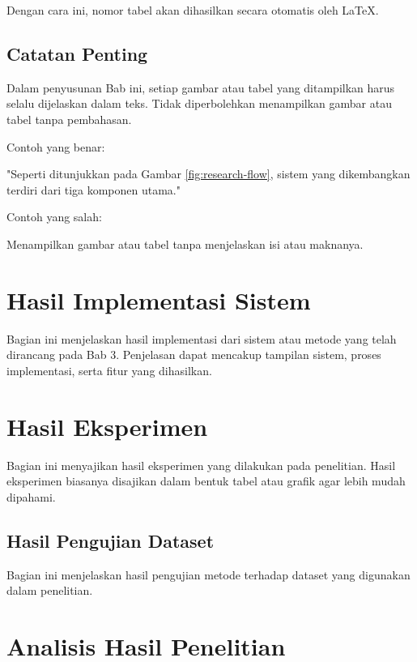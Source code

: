 Dengan cara ini, nomor tabel akan dihasilkan secara otomatis oleh
\LaTeX.

\subsection{Catatan Penting}

Dalam penyusunan Bab ini, setiap gambar atau tabel yang ditampilkan
harus selalu dijelaskan dalam teks. Tidak diperbolehkan menampilkan
gambar atau tabel tanpa pembahasan.

Contoh yang benar:

"Seperti ditunjukkan pada Gambar \ref{fig:research-flow}, sistem yang dikembangkan terdiri dari tiga komponen utama."

Contoh yang salah:

Menampilkan gambar atau tabel tanpa menjelaskan isi atau maknanya.

\section{Hasil Implementasi Sistem}

Bagian ini menjelaskan hasil implementasi dari sistem atau metode yang
telah dirancang pada Bab 3. Penjelasan dapat mencakup tampilan sistem,
proses implementasi, serta fitur yang dihasilkan.

\section{Hasil Eksperimen}

Bagian ini menyajikan hasil eksperimen yang dilakukan pada penelitian.
Hasil eksperimen biasanya disajikan dalam bentuk tabel atau grafik agar
lebih mudah dipahami.

\subsection{Hasil Pengujian Dataset}

Bagian ini menjelaskan hasil pengujian metode terhadap dataset yang
digunakan dalam penelitian.

\section{Analisis Hasil Penelitian}

